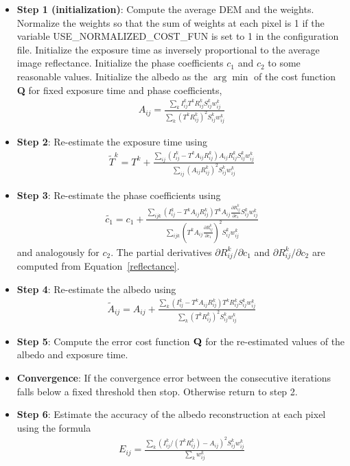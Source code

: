 \documentclass[letterpaper,fleqn,11pt]{report}
\begin{document}
\begin{itemize}
\item {\bf Step 1 (initialization)}: Compute the average DEM and the weights.
Normalize the weights so that the sum of weights at each pixel is 1 if the
  variable USE\_NORMALIZED\_COST\_FUN is set to 1 in the configuration file. 
  Initialize the exposure time as inversely proportional to the average image
  reflectance. Initialize the phase coefficients $c_1$ and $c_2$ to some
  reasonable values. Initialize the albedo as the $\arg \min$ of the
  cost function {\bf Q} for fixed exposure time and phase
  coefficients, 
\begin{eqnarray}
A_{ij} = \frac{\sum_k I_{ij}^k T^kR^k_{ij} S^k_{ij}w^k_{ij}}{\sum_k (T^k R^k_{ij})^2 S^k_{ij}w^k_{ij}}
\label{albedo_init}
\end{eqnarray}

\item {\bf Step 2}: Re-estimate the exposure time using
\begin{eqnarray}
\tilde{T} ^k = T^k + \frac{\sum_{ij} (I_{ij}^k-T^kA_{ij}R^k_{ij})A_{ij}R^k_{ij}S^k_{ij}w^k_{ij}}{\sum_{ij}(A_{ij} R^k_{ij})^2 S^k_{ij}w^k_{ij}}
\label{exposure_iter}
\end {eqnarray}

\item {\bf Step 3}: Re-estimate the phase coefficients using
\begin{eqnarray}
\tilde{c_1} = c_1 + \frac{\sum_{ijk}
  (I_{ij}^k-T^kA_{ij}R^k_{ij})T^kA_{ij} \frac{\partial R^k_{ij}}{\partial c_1}S^k_{ij}w^k_{ij}}{\sum_{ijk}\left(T^kA_{ij}\frac{\partial R^k_{ij}}{\partial c_1}\right)^2 S^k_{ij}w^k_{ij}}
\label{phasecoeff_iter}
\end {eqnarray}
and analogously for $c_2$. The partial derivatives $\partial
R^k_{ij}/\partial c_1$ and $\partial R^k_{ij}/\partial c_2$ are
computed from Equation~\ref{reflectance}.

\item {\bf Step 4}: Re-estimate the albedo using
\begin{eqnarray}
\tilde{A}_{ij}=A_{ij}+\frac{\sum_k (I_{ij}^k-T^kA_{ij}R^k_{ij}) T^kR^k_{ij}S^k_{ij}w^k_{ij}}{\sum_k (T^k R^k_{ij})^2 S^k_{ij}w^k_{ij}}
\label{albedo_iter}
\end {eqnarray}

\item {\bf Step 5}: Compute the error cost function $\bf Q$ for the re-estimated values of the albedo and exposure time.

\item {\bf Convergence}: If the convergence error between the consecutive iterations falls below a fixed threshold then stop. Otherwise return to step 2.

\item {\bf Step 6}: Estimate the accuracy of the albedo reconstruction
  at each pixel using the formula
\begin{eqnarray}
E_{ij}=\frac{\sum_k (I_{ij}^k/(T^k R^k_{ij})-A_{ij}) ^2S^k_{ij}w^k_{ij}}{\sum_k w^k_{ij}}
\label{albedo_error}
\end {eqnarray}

\end{itemize}
\end{document}

